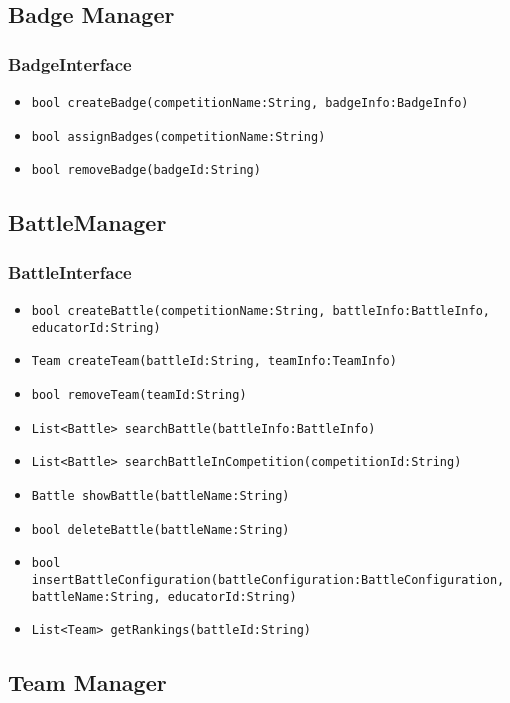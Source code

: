 \subsection{Badge Manager}
\subsubsection{BadgeInterface}
\begin{itemize}
    \item \texttt{bool createBadge(competitionName:String, badgeInfo:BadgeInfo)}%
    \item \texttt{bool assignBadges(competitionName:String)}
    \item \texttt{bool removeBadge(badgeId:String)}
\end{itemize}

\subsection{BattleManager}
\subsubsection{BattleInterface}
\begin{itemize}
    \item \texttt{bool createBattle(competitionName:String, battleInfo:BattleInfo,\\educatorId:String)}
    \item \texttt{Team createTeam(battleId:String, teamInfo:TeamInfo)}%
    \item \texttt{bool removeTeam(teamId:String)}
    \item \texttt{List<Battle> searchBattle(battleInfo:BattleInfo)}
    \item \texttt{List<Battle> searchBattleInCompetition(competitionId:String)}%
    \item \texttt{Battle showBattle(battleName:String)}
    \item \texttt{bool deleteBattle(battleName:String)}
    \item \texttt{bool insertBattleConfiguration(battleConfiguration:BattleConfiguration, battleName:String, educatorId:String)}%
    \item \texttt{List<Team> getRankings(battleId:String)}
\end{itemize}

\subsection{Team Manager}
